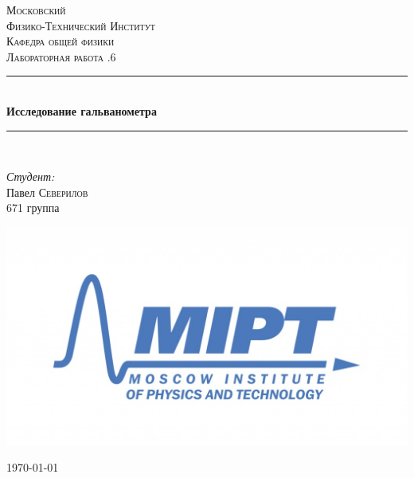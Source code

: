\documentclass[a4paper, 12pt]{article}
\newenvironment{bottompar}{\par\vspace*{\fill}}{\clearpage}
\begin{document}
\begin{titlepage}

\newcommand{\HRule}{\rule{\linewidth}{0.5mm}} %

\center %
 

\textsc{\LARGE Московский \\[0.5cm] Физико-Технический Институт}\\[1,5cm] %
\textsc{\Large Кафедра общей физики}\\[0.5cm] %
\textsc{\large Лабораторная работа .6}\\[0.5cm] %


\HRule
\\[0.4cm]
{ \huge \bfseries Исследование гальванометра}
\\[0.2cm] %
\HRule
\\[1.5cm]


 

	\begin{flushleft} \large
		\emph{Студент:}\\
		Павел \textsc{Северилов} \\
		671 группа
	\end{flushleft}

\begin{bottompar}
	\begin{center}
		\includegraphics[width = 80 mm]{logo.jpg}
	\end{center}
	{\large \today}

\end{bottompar}
\vfill %

\end{titlepage}
\end{document}
